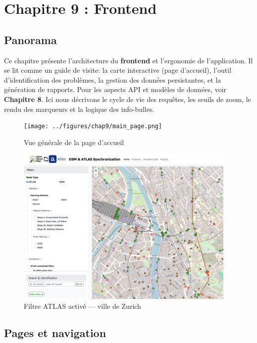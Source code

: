 \chapter{Chapitre 9 : Frontend}

\section*{Panorama}

Ce chapitre présente l'architecture du \textbf{frontend} et l'ergonomie de l'application. Il se lit comme un guide de visite: la carte interactive (page d'accueil), l'outil d'identification des problèmes, la gestion des données persistantes, et la génération de rapports. Pour les aspects API et modèles de données, voir \textbf{Chapitre 8}. Ici nous décrivons le cycle de vie des requêtes, les seuils de zoom, le rendu des marqueurs et la logique des info-bulles.

\medskip
\noindent
\begin{figure}[h]
  \centering
  \texttt{[image: ../figures/chap9/main\_page.png]}
  \caption[Page d'accueil]{Vue générale de la page d'accueil}
  \label{fig:frontend-index-main}
\end{figure}

\begin{figure}[h]
  \centering
  \includegraphics[width=0.95\textwidth]{../figures/chap9/atlas filter activ main page.png}
  \caption[Filtre ATLAS (Zurich)]{Filtre ATLAS activé — ville de Zurich}
  \label{fig:frontend-index-filters}
\end{figure}

\section{Pages et navigation}

